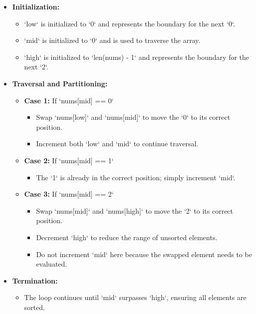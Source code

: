 \begin{itemize}
    \item \textbf{Initialization:}
    \begin{itemize}
        \item `low` is initialized to `0` and represents the boundary for the next `0`.
        \item `mid` is initialized to `0` and is used to traverse the array.
        \item `high` is initialized to `len(nums) - 1` and represents the boundary for the next `2`.
    \end{itemize}
    
    \item \textbf{Traversal and Partitioning:}
    \begin{itemize}
        \item \textbf{Case 1:} If `nums[mid] == 0`
        \begin{itemize}
            \item Swap `nums[low]` and `nums[mid]` to move the `0` to its correct position.
            \item Increment both `low` and `mid` to continue traversal.
        \end{itemize}
        
        \item \textbf{Case 2:} If `nums[mid] == 1`
        \begin{itemize}
            \item The `1` is already in the correct position; simply increment `mid`.
        \end{itemize}
        
        \item \textbf{Case 3:} If `nums[mid] == 2`
        \begin{itemize}
            \item Swap `nums[mid]` and `nums[high]` to move the `2` to its correct position.
            \item Decrement `high` to reduce the range of unsorted elements.
            \item Do not increment `mid` here because the swapped element needs to be evaluated.
        \end{itemize}
    \end{itemize}
    
    \item \textbf{Termination:}
    \begin{itemize}
        \item The loop continues until `mid` surpasses `high`, ensuring all elements are sorted.
    \end{itemize}
\end{itemize}

